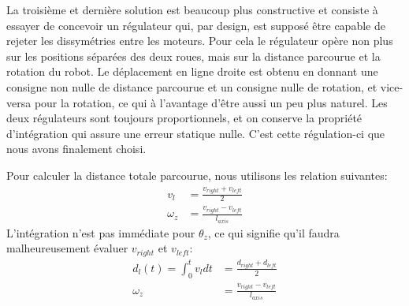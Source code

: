 La troisième et dernière solution est beaucoup plus constructive et consiste à essayer de concevoir un régulateur qui, par design, est supposé être capable de rejeter les dissymétries entre les moteurs. Pour cela le régulateur opère non plus sur les positions séparées des deux roues, mais sur la distance parcourue et la rotation du robot. Le déplacement en ligne droite est obtenu en donnant une consigne non nulle de distance parcourue et un consigne nulle de rotation, et vice-versa pour la rotation, ce qui à l'avantage d'être aussi un peu plus naturel. Les deux régulateurs sont toujours proportionnels, et on conserve la propriété d'intégration qui assure une erreur statique nulle. C'est cette régulation-ci que nous avons finalement choisi.

Pour calculer la distance totale parcourue, nous utilisons les relation suivantes:
\begin{align*}
  v_l &= \frac{v_{right}+v_{left}}{2}\\
  \omega_z &= \frac{v_{right} - v_{left}}{l_{axis}}
\end{align*}
L'intégration n'est pas immédiate pour $\theta_z$, ce qui signifie qu'il faudra malheureusement évaluer $v_{right}$ et $v_{left}$:
\begin{align*}
  d_l(t) = \int_0^tv_l dt &= \frac{d_{right}+d_{left}}{2}\\
  \omega_z &= \frac{v_{right} - v_{left}}{l_{axis}}
\end{align*}